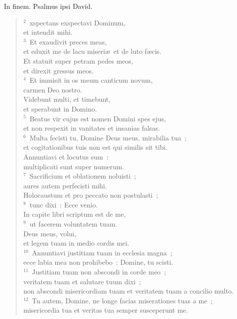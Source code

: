 \bchapter[Psalm]
In finem. Psalmus ipsi David.
\begin{verse}${}^{2}$~xspectans exspectavi Dominum,\\ et intendit mihi.\\
${}^{3}$~Et exaudivit preces meas,\\ et eduxit me de lacu miseri\ae\ et de luto f\ae cis.\\ Et statuit super petram pedes meos,\\ et direxit gressus meos.\\
${}^{4}$~Et immisit in os meum canticum novum,\\ carmen Deo nostro.\\ Videbunt multi, et timebunt,\\ et sperabunt in Domino.\\
${}^{5}$~Beatus vir cujus est nomen Domini spes ejus,\\ et non respexit in vanitates et insanias falsas.\\
${}^{6}$~Multa fecisti tu, Domine Deus meus, mirabilia tua~;\\ et cogitationibus tuis non est qui similis sit tibi.\\ Annuntiavi et locutus sum~:\\ multiplicati sunt super numerum.\\
${}^{7}$~Sacrificium et oblationem noluisti~;\\ aures autem perfecisti mihi.\\ Holocaustum et pro peccato non postulasti~;\\
${}^{8}$~tunc dixi~: Ecce venio.\\ In capite libri scriptum est de me,\\
${}^{9}$~ut facerem voluntatem tuam.\\ Deus meus, volui,\\ et legem tuam in medio cordis mei.\\
${}^{10}$~Annuntiavi justitiam tuam in ecclesia magna~;\\ ecce labia mea non prohibebo~: Domine, tu scisti.\\
${}^{11}$~Justitiam tuam non abscondi in corde meo~;\\ veritatem tuam et salutare tuum dixi~;\\ non abscondi misericordiam tuam et veritatem tuam a concilio multo.\\
${}^{12}$~Tu autem, Domine, ne longe facias miserationes tuas a me~;\\ misericordia tua et veritas tua semper susceperunt me.\\

\end{verse}
